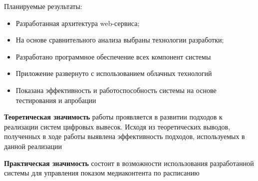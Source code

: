 Планируемые результаты:

\begin{itemize}
	\item Разработанная архитектура web-сервиса;
    \item На основе сравнительного анализа выбраны технологии разработки;
    \item Разработано программное обеспечение всех компонент системы
    \item Приложение развернуто с использованием облачных технологий
    \item Показана эффективность и работоспособность системы на основе тестирования и апробации
\end{itemize}

\textbf{Теоретическая значимость} работы проявляется в развитии подходов к реализации  систем цифровых вывесок.
Исходя из теоретических выводов, полученных в ходе работы выявлена эффективность подходов,
используемых в данной реализации

\textbf{Практическая значимость} состоит в возможности использования разработанной системы
для управления показом медиаконтента по расписанию

